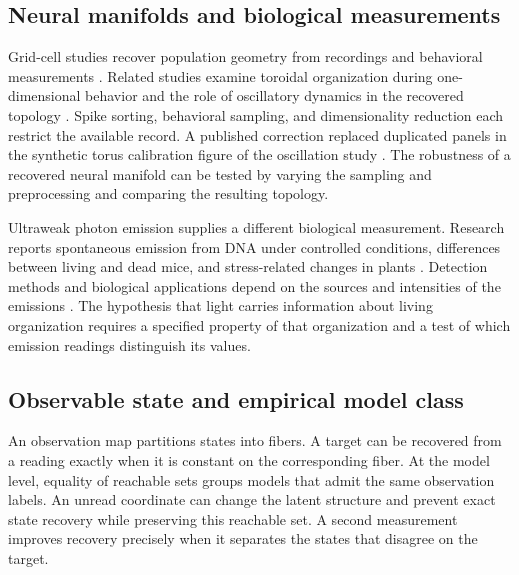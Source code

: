 \subsection{Neural manifolds and biological measurements}

Grid-cell studies recover population geometry from recordings and behavioral measurements \parencite{Gardner2022}. Related studies examine toroidal organization during one-dimensional behavior and the role of oscillatory dynamics in the recovered topology \parencite{Hermansen2024,DiSarra2025}. Spike sorting, behavioral sampling, and dimensionality reduction each restrict the available record. A published correction replaced duplicated panels in the synthetic torus calibration figure of the oscillation study \parencite{DiSarra2025Correction}. The robustness of a recovered neural manifold can be tested by varying the sampling and preprocessing and comparing the resulting topology.

Ultraweak photon emission supplies a different biological measurement. Research reports spontaneous emission from DNA under controlled conditions, differences between living and dead mice, and stress-related changes in plants \parencite{PietruszkaMarzec2024,Salari2025}. Detection methods and biological applications depend on the sources and intensities of the emissions \parencite{Mould2024}. The hypothesis that light carries information about living organization requires a specified property of that organization and a test of which emission readings distinguish its values.

\subsection{Observable state and empirical model class}

An observation map partitions states into fibers. A target can be recovered from a reading exactly when it is constant on the corresponding fiber. At the model level, equality of reachable sets groups models that admit the same observation labels. An unread coordinate can change the latent structure and prevent exact state recovery while preserving this reachable set. A second measurement improves recovery precisely when it separates the states that disagree on the target.
